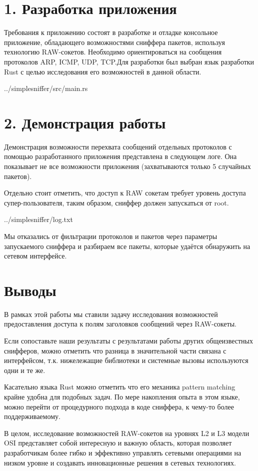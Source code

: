 \section*{1. Разработка приложения}

Требования к приложению состоят в разработке и отладке консольное приложение, обладающего возможностями сниффера пакетов, используя технологию RAW-сокетов. Необходимо ориентироваться на сообщения протоколов ARP, ICMP, UDP, TCP.Для разработки был выбран язык разработки Rust с целью исследования его возможностей в данной области.


{../simplesniffer/src/main.rs}

\section*{2. Демонстрация работы}

Демонстрация возможности перехвата сообщений отдельных протоколов с помощью разработанного приложения представлена в следующем логе. Она показывает не все возможности приложения (захватываются только 5 случайных пакетов).

Отдельно стоит отметить, что доступ к RAW сокетам требует уровень доступа супер-пользователя, таким образом, сниффер должен запускаться от root.


{../simplesniffer/log.txt}

Мы отказались от фильтрации протоколов и пакетов через параметры запускаемого сниффера и разбираем все пакеты, которые удаётся обнаружить на сетевом интерфейсе.

\section*{Выводы}

В рамках этой работы мы ставили задачу исследования возможностей предоставления доступа к полям заголовков сообщений через RAW-сокеты.

Если сопоставьте наши результаты с результатами работы других общеизвестных снифферов, можно отметить что разница в значительной части связана с интерфейсом, т.к. нижележащие библиотеки и системные вызовы используются одни и те же.

Касательно языка Rust можно отметить что его механика pattern matching крайне удобна для подобных задач. По мере накопления опыта в этом языке, можно перейти от процедурного подхода в коде сниффера, к чему-то более поддерживаемому.

В целом, исследование возможностей RAW-сокетов на уровнях L2 и L3 модели OSI представляет собой интересную и важную область, которая позволяет разработчикам более гибко и эффективно управлять сетевыми операциями на низком уровне и создавать инновационные решения в сетевых технологиях.

